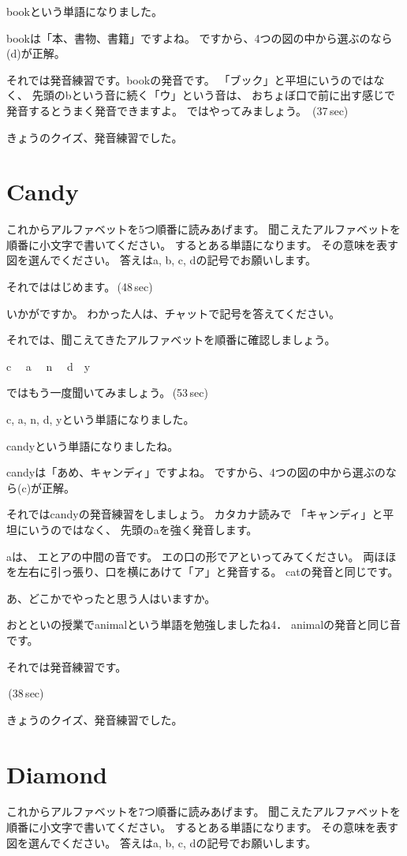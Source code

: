 \documentclass[12pt]{jlreq}
\begin{document}
bookという単語になりました。

bookは「本、書物、書籍」ですよね。
ですから、4つの図の中から選ぶのなら(d)が正解。

それでは発音練習です。bookの発音です。
「ブック」と平坦にいうのではなく、
先頭のbという音に続く「ウ」という音は、
おちょぼ口で前に出す感じで発音するとうまく発音できますよ。
ではやってみましょう。
\faVolumeUp\,(37\,sec)

きょうのクイズ、発音練習でした。
\section{Candy}
これからアルファベットを5つ順番に読みあげます。
聞こえたアルファベットを順番に小文字で書いてください。
するとある単語になります。
その意味を表す図を選んでください。
答えはa, b, c, dの記号でお願いします。

それでははじめます。\faVolumeUp\,(48\,sec)

いかがですか。
わかった人は、チャットで記号を答えてください。

それでは、聞こえてきたアルファベットを順番に確認しましょう。{\large \ComputerMouse}

c\,\,
{\large \ComputerMouse}\,\,
a\,\,
{\large \ComputerMouse}\,\,
n\,\,
{\large \ComputerMouse}\,\,
d
{\large \ComputerMouse}\,\,
y

ではもう一度聞いてみましょう。\faVolumeUp\,(53\,sec)

c, a, n, d, yという単語になりました。

candyという単語になりましたね。

candyは「あめ、キャンディ」ですよね。
ですから、4つの図の中から選ぶのなら(c)が正解。

それではcandyの発音練習をしましょう。
カタカナ読みで
「キャンディ」と平坦にいうのではなく、
先頭のaを強く発音します。

aは、
エとアの中間の音です。
エの口の形でアといってみてください。
両ほほを左右に引っ張り、口を横にあけて「ア」と発音する。
catの発音と同じです。

あ、どこかでやったと思う人はいますか。

おとといの授業でanimalという単語を勉強しましたね4．
animalの発音と同じ音です。

それでは発音練習です。

\faVolumeUp\,(38\,sec)

きょうのクイズ、発音練習でした。
\section{Diamond}
これからアルファベットを7つ順番に読みあげます。
聞こえたアルファベットを順番に小文字で書いてください。
するとある単語になります。
その意味を表す図を選んでください。
答えはa, b, c, dの記号でお願いします。
\end{document}

